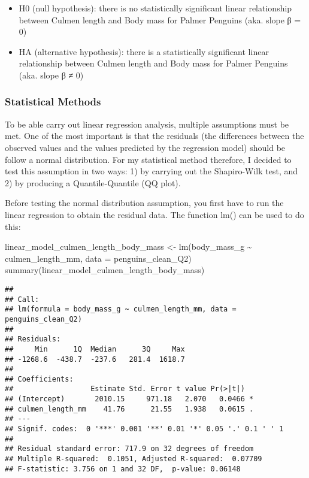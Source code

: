 \documentclass[
]{article}
\newenvironment{Shaded}{\begin{snugshade}}{\end{snugshade}}
\newcommand{\AttributeTok}[1]{\textcolor[rgb]{0.77,0.63,0.00}{#1}}
\newcommand{\FunctionTok}[1]{\textcolor[rgb]{0.00,0.00,0.00}{#1}}
\newcommand{\NormalTok}[1]{#1}
\newcommand{\OtherTok}[1]{\textcolor[rgb]{0.56,0.35,0.01}{#1}}
\newcommand{\SpecialCharTok}[1]{\textcolor[rgb]{0.00,0.00,0.00}{#1}}
\providecommand{\tightlist}{%
  \setlength{\itemsep}{0pt}\setlength{\parskip}{0pt}}
\begin{document}
\begin{itemize}
\tightlist
\item
  H0 (null hypothesis): there is no statistically significant linear
  relationship between Culmen length and Body mass for Palmer Penguins
  (aka. slope β = 0)
\item
  HA (alternative hypothesis): there is a statistically significant
  linear relationship between Culmen length and Body mass for Palmer
  Penguins (aka. slope β ≠ 0)
\end{itemize}

\hypertarget{statistical-methods}{%
\subsubsection{Statistical Methods}\label{statistical-methods}}

To be able carry out linear regression analysis, multiple assumptions
must be met. One of the most important is that the residuals (the
differences between the observed values and the values predicted by the
regression model) should be follow a normal distribution. For my
statistical method therefore, I decided to test this assumption in two
ways: 1) by carrying out the Shapiro-Wilk test, and 2) by producing a
Quantile-Quantile (QQ plot).

Before testing the normal distribution assumption, you first have to run
the linear regression to obtain the residual data. The function lm() can
be used to do this:

\begin{Shaded}
\begin{Highlighting}[]
\NormalTok{linear\_model\_culmen\_length\_body\_mass }\OtherTok{\textless{}{-}} \FunctionTok{lm}\NormalTok{(body\_mass\_g }\SpecialCharTok{\textasciitilde{}}\NormalTok{ culmen\_length\_mm, }\AttributeTok{data =}\NormalTok{ penguins\_clean\_Q2)}
\FunctionTok{summary}\NormalTok{(linear\_model\_culmen\_length\_body\_mass)}
\end{Highlighting}
\end{Shaded}

\begin{verbatim}
## 
## Call:
## lm(formula = body_mass_g ~ culmen_length_mm, data = penguins_clean_Q2)
## 
## Residuals:
##     Min      1Q  Median      3Q     Max 
## -1268.6  -438.7  -237.6   281.4  1618.7 
## 
## Coefficients:
##                  Estimate Std. Error t value Pr(>|t|)  
## (Intercept)       2010.15     971.18   2.070   0.0466 *
## culmen_length_mm    41.76      21.55   1.938   0.0615 .
## ---
## Signif. codes:  0 '***' 0.001 '**' 0.01 '*' 0.05 '.' 0.1 ' ' 1
## 
## Residual standard error: 717.9 on 32 degrees of freedom
## Multiple R-squared:  0.1051, Adjusted R-squared:  0.07709 
## F-statistic: 3.756 on 1 and 32 DF,  p-value: 0.06148
\end{verbatim}
\end{document}
